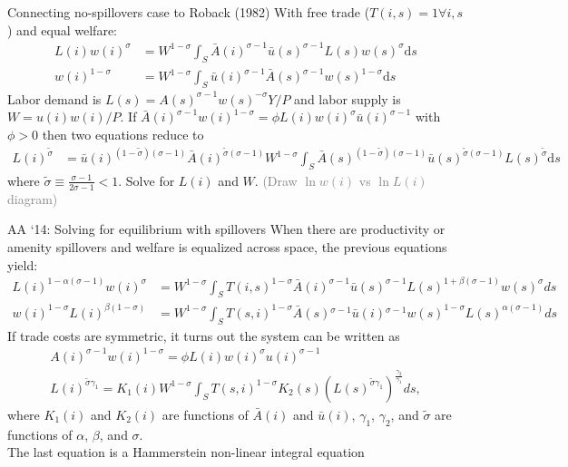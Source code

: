 \documentclass[11pt,notes=hide,aspectratio=169]{beamer}
\begin{document}
\begin{frame}{Connecting no-spillovers case to Roback (1982)}
With free trade ($T(i,s) = 1 \forall i,s$) and equal welfare:
\begin{align*}
L(i)w(i)^{\sigma}
&=
W^{1-\sigma} \int_{S} \bar{A}(i)^{\sigma-1}\bar{u}(s)^{\sigma-1}L(s)w(s)^{\sigma}\textrm{d}s 
\\
w(i)^{1-\sigma}
&=
W^{1-\sigma} \int_{S} \bar{u}(i)^{\sigma-1}\bar{A}(s)^{\sigma-1}w(s)^{1-\sigma}\textrm{d}s 
\end{align*}
Labor demand is $L(s) = A(s)^{\sigma-1} w(s)^{-\sigma} Y/P$
and labor supply is $W = u(i)w(i)/P$.
If $\bar{A}(i)^{\sigma-1}w(i)^{1-\sigma} = \phi L(i)w(i)^{\sigma}\bar{u}(i)^{\sigma-1}$ with $\phi>0$ then
two equations reduce to
\begin{align*}
L(i)^{\tilde{\sigma}} 
&=
\bar{u}(i)^{(1-\tilde{\sigma})(\sigma-1)} \bar{A}(i)^{\tilde{\sigma}(\sigma-1)} W^{1-\sigma}
\int_{S} \bar{A}(s)^{(1-\tilde{\sigma})(\sigma-1)} \bar{u}(s)^{\tilde{\sigma}(\sigma-1)} L(s)^{\tilde{\sigma}} \textrm{d} s
\end{align*}
where $\tilde{\sigma} \equiv \frac{\sigma-1}{2\sigma-1} <1$.
Solve for $L(i)$ and $W$.
\textcolor{gray}{(Draw $\ln w(i)$ vs $\ln L(i)$ diagram)}
\end{frame}
\begin{frame}{AA `14: Solving for equilibrium with spillovers}
When there are productivity or amenity spillovers and welfare is equalized across space, the previous equations yield:
\begin{align*}
L(i)^{1-\alpha(\sigma-1)}w(i)^{\sigma}&=W^{1-\sigma}\int_{S}T(i,s)^{1-\sigma}\bar{A}(i)^{\sigma-1}\bar{u}(s)^{\sigma-1}L(s)^{1+\beta(\sigma-1)}w(s)^{\sigma}ds \\ 
w(i)^{1-\sigma}L(i)^{\beta(1-\sigma)}&=W^{1-\sigma}\int_{S}T(s,i)^{1-\sigma}\bar{A}(s){}^{\sigma-1}\bar{u}(i){}^{\sigma-1}w(s)^{1-\sigma}L(s)^{\alpha(\sigma-1)}ds
\end{align*}
If trade costs are symmetric, it turns out the system can be written as
\begin{align}
A(i)^{\sigma-1}w(i)^{1-\sigma} =\phi L(i)w(i)^{\sigma}u(i)^{\sigma-1} \label{eq:bla} \\
L(i)^{\tilde{\sigma}\gamma_{1}} =K_{1}(i)W^{1-\sigma}\int_{S}T\left(s,i\right)^{1-\sigma}K_{2}(s)\left(L(s)^{\tilde{\sigma}\gamma_{1}}\right)^{\frac{\gamma_{2}}{\gamma_{1}}}ds, 
\end{align}
where $K_{1}(i)$  and $K_{2}(i)$ are functions of $\bar{A}(i)$ and $\bar{u}(i)$, $\gamma_{1}$, $\gamma_{2}$, and $\tilde{\sigma}$ are functions of $\alpha$, $\beta$, and $\sigma$. 
\\
The last equation is a Hammerstein non-linear integral equation 
\end{frame}
\end{document}
